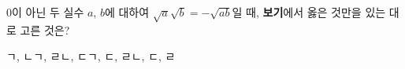 $0$이 아닌 두 실수 $a$, $b$에 대하여 $\sqrt{a}\sqrt{b}=-\sqrt{ab}$일 때, \textbf{보기}에서 옳은 것만을 있는 대로 고른 것은? 
\begin{choices32}{ㄱ, ㄴ}{ㄱ, ㄹ}{ㄴ, ㄷ}{ㄱ, ㄷ, ㄹ}{ㄴ, ㄷ, ㄹ}\end{choices32}
